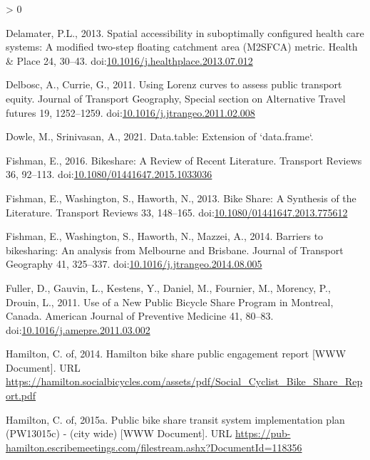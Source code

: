 \documentclass[]{elsarticle} %
\newlength{\cslhangindent}
\newenvironment{CSLReferences}[2] %
 {%
  \setlength{\parindent}{0pt}
  \ifodd #1 \everypar{\setlength{\hangindent}{\cslhangindent}}\ignorespaces\fi
  \ifnum #2 > 0
  \setlength{\parskip}{#2\baselineskip}
  \fi
 }%
 {}
\begin{document}
\begin{CSLReferences}{1}{0}
\leavevmode\hypertarget{ref-delamaterSpatialAccessibilitySuboptimally2013}{}%
Delamater, P.L., 2013. Spatial accessibility in suboptimally configured
health care systems: {A} modified two-step floating catchment area
({M2SFCA}) metric. Health \& Place 24, 30--43.
doi:\href{https://doi.org/10.1016/j.healthplace.2013.07.012}{10.1016/j.healthplace.2013.07.012}

\leavevmode\hypertarget{ref-delboscUsingLorenzCurves2011}{}%
Delbosc, A., Currie, G., 2011. Using {Lorenz} curves to assess public
transport equity. Journal of Transport Geography, Special section on
{Alternative Travel} futures 19, 1252--1259.
doi:\href{https://doi.org/10.1016/j.jtrangeo.2011.02.008}{10.1016/j.jtrangeo.2011.02.008}

\leavevmode\hypertarget{ref-R-data.table}{}%
Dowle, M., Srinivasan, A., 2021. Data.table: Extension of `data.frame`.

\leavevmode\hypertarget{ref-fishmanBikeshareReviewRecent2016}{}%
Fishman, E., 2016. Bikeshare: {A Review} of {Recent Literature}.
Transport Reviews 36, 92--113.
doi:\href{https://doi.org/10.1080/01441647.2015.1033036}{10.1080/01441647.2015.1033036}

\leavevmode\hypertarget{ref-fishmanBikeShareSynthesis2013}{}%
Fishman, E., Washington, S., Haworth, N., 2013. Bike {Share}: {A
Synthesis} of the {Literature}. Transport Reviews 33, 148--165.
doi:\href{https://doi.org/10.1080/01441647.2013.775612}{10.1080/01441647.2013.775612}

\leavevmode\hypertarget{ref-fishmanBarriersBikesharingAnalysis2014}{}%
Fishman, E., Washington, S., Haworth, N., Mazzei, A., 2014. Barriers to
bikesharing: An analysis from {Melbourne} and {Brisbane}. Journal of
Transport Geography 41, 325--337.
doi:\href{https://doi.org/10.1016/j.jtrangeo.2014.08.005}{10.1016/j.jtrangeo.2014.08.005}

\leavevmode\hypertarget{ref-fullerUseNewPublic2011}{}%
Fuller, D., Gauvin, L., Kestens, Y., Daniel, M., Fournier, M., Morency,
P., Drouin, L., 2011. Use of a {New Public Bicycle Share Program} in
{Montreal}, {Canada}. American Journal of Preventive Medicine 41,
80--83.
doi:\href{https://doi.org/10.1016/j.amepre.2011.03.002}{10.1016/j.amepre.2011.03.002}

\leavevmode\hypertarget{ref-hamiltonsobi2014}{}%
Hamilton, C. of, 2014. Hamilton bike share public engagement report
{[}WWW Document{]}. URL
\url{https://hamilton.socialbicycles.com/assets/pdf/Social_Cyclist_Bike_Share_Report.pdf}

\leavevmode\hypertarget{ref-hamiltonsobi2015}{}%
Hamilton, C. of, 2015a. Public bike share transit system implementation
plan (PW13015c) - (city wide) {[}WWW Document{]}. URL
\url{https://pub-hamilton.escribemeetings.com/filestream.ashx?DocumentId=118356}


\end{CSLReferences}
\end{document}
